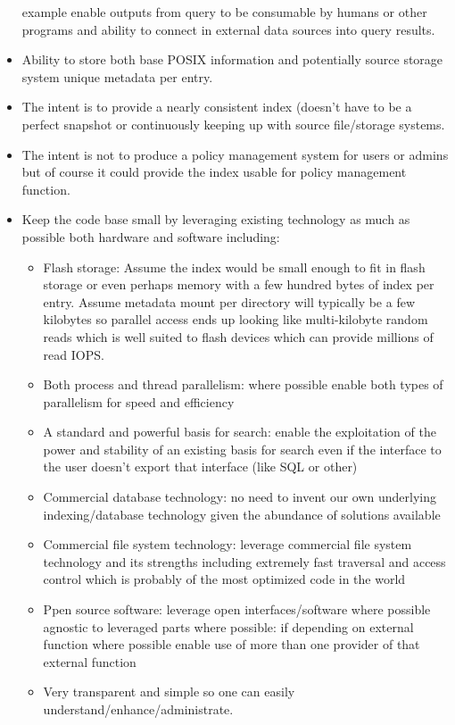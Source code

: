 \begin{itemize}
  example enable outputs from query to be consumable by humans or
  other programs and ability to connect in external data sources into
  query results.
\item Ability to store both base POSIX information and potentially
  source storage system unique metadata per entry.
\item The intent is to provide a nearly consistent index (doesn't have
  to be a perfect snapshot or continuously keeping up with source
  file/storage systems.
\item The intent is not to produce a policy management system for
  users or admins but of course it could provide the index usable for
  policy management function.
\item Keep the code base small by leveraging existing technology as
  much as possible both hardware and software including:
  \begin{itemize}
  \item Flash storage: Assume the index would be small enough to fit
    in flash storage or even perhaps memory with a few hundred bytes
    of index per entry.  Assume metadata mount per directory will
    typically be a few kilobytes so parallel access ends up looking
    like multi-kilobyte random reads which is well suited to flash
    devices which can provide millions of read IOPS.
  \item Both process and thread parallelism: where possible enable
    both types of parallelism for speed and efficiency
  \item A standard and powerful basis for search: enable the
    exploitation of the power and stability of an existing basis for
    search even if the interface to the user doesn't export that
    interface (like SQL or other)
  \item Commercial database technology: no need to invent our own
    underlying indexing/database technology given the abundance of
    solutions available
  \item Commercial file system technology: leverage commercial file
    system technology and its strengths including extremely fast
    traversal and access control which is probably of the most
    optimized code in the world
  \item Ppen source software: leverage open interfaces/software where
    possible agnostic to leveraged parts where possible: if depending
    on external function where possible enable use of more than one
    provider of that external function
  \item Very transparent and simple so one can easily \\
    understand/enhance/administrate.
  \end{itemize}
\end{itemize}
